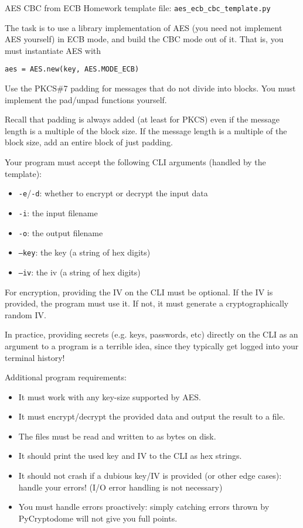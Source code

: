 \documentclass{homework}
\begin{document}
\begin{task}{AES CBC from ECB}
  Homework template file: \texttt{aes\_ecb\_cbc\_template.py}

  The task is to use a library implementation of AES (you need not implement AES yourself) in ECB mode, and build the CBC mode out of it.
  That is, you must instantiate AES with
  \begin{center}
    \texttt{aes = AES.new(key, AES.MODE\_ECB)}
  \end{center}
  Use the PKCS\#7 padding for messages that do not divide into blocks.
  You must implement the pad/unpad functions yourself.
  \begin{tcolorbox}[title=Padding]
    Recall that padding is always added (at least for PKCS) even if the message length is a multiple of the block size.
    If the message length is a multiple of the block size, add an entire block of just padding.
  \end{tcolorbox}

  Your program must accept the following CLI arguments (handled by the template):
  \begin{itemize}
    \item \texttt{-e}/\texttt{-d}: whether to encrypt or decrypt the input data
    \item \texttt{-i}: the input filename
    \item \texttt{-o}: the output filename
    \item \texttt{--key}: the key (a string of hex digits)
    \item \texttt{--iv}: the iv (a string of hex digits)
  \end{itemize}

  For encryption, providing the IV on the CLI must be optional.
  If the IV is provided, the program must use it.
  If not, it must generate a cryptographically random IV.

  \begin{tcolorbox}[title=Note]
    In practice, providing secrets (e.g. keys, passwords, etc) directly on the CLI as an argument to a program is a terrible idea, since they typically get logged into your terminal history!
  \end{tcolorbox}

  Additional program requirements:
  \begin{itemize}
    \item It must work with any key-size supported by AES.
    \item It must encrypt/decrypt the provided data and output the result to a file.
    \item The files must be read and written to as bytes on disk.
    \item It should print the used key and IV to the CLI as hex strings.
    \item It should not crash if a dubious key/IV is provided (or other edge cases): handle your errors! (I/O error handling is not necessary)
    \item You must handle errors proactively: simply catching errors thrown by PyCryptodome will not give you full points.
  \end{itemize}


\end{task}
\end{document}
